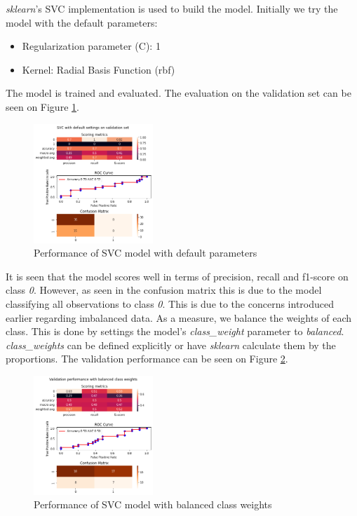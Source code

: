 \textit{sklearn}'s SVC implementation is used to build the model. Initially we try the model with the default parameters: 
\begin{itemize}
  \item Regularization parameter (C): 1
  \item Kernel: Radial Basis Function (rbf)
\end{itemize}

\noindent The model is trained and evaluated. The evaluation on the validation set can be seen on Figure \ref{fig:results_default}.

\begin{figure}[H]
  \centering
  \includegraphics[width=0.4\textwidth]{../project/images/results_default-svc.png}
  \caption{Performance of SVC model with default parameters}
  \label{fig:results_default}
\end{figure}
It is seen that the model scores well in terms of precision, recall and f1-score on class \textit{0}. However, as seen in the confusion matrix this is due to the model classifying all observations to class \textit{0}. This is due to the concerns introduced earlier regarding imbalanced data. As a measure, we balance the weights of each class. This is done by settings the model's \textit{class\_weight} parameter to \textit{balanced}. \textit{class\_weights} can be defined explicitly or have \textit{sklearn} calculate them by the proportions. The validation performance can be seen on Figure \ref{fig:results_default_balanced}.

\begin{figure}[H]
  \centering
  \includegraphics[width=0.4\textwidth]{../project/images/results_default_balanced-svc.png}
  \caption{Performance of SVC model with balanced class weights}
  \label{fig:results_default_balanced}
\end{figure}

